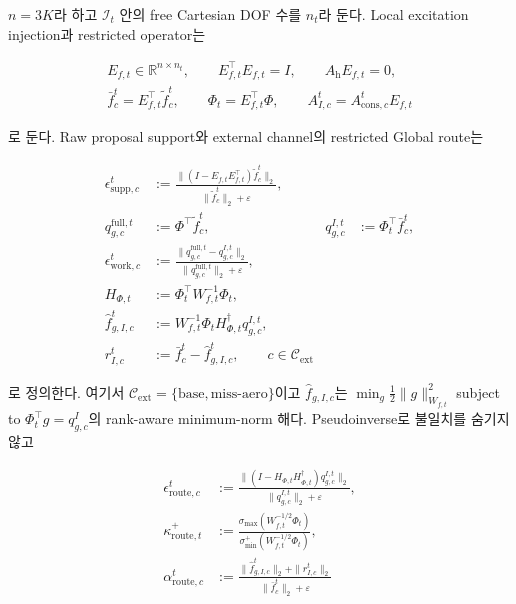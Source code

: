 \documentclass[11pt,a4paper]{article}
\newcommand{\R}{\mathbb{R}}
\newcommand{\eps}{\varepsilon}
\begin{document}
\(n=3K\)라 하고 \(\mathcal I_t\) 안의 free Cartesian DOF 수를 \(n_t\)라 둔다.
Local excitation injection과 restricted operator는

\begin{equation}
\begin{gathered}
  E_{f,t}\in\R^{n\times n_t},\qquad E_{f,t}^\top E_{f,t}=I,
  \qquad A_{\mathrm h}E_{f,t}=0,\\
  \bar f_c^t=E_{f,t}^\top\widetilde f_c^t,\qquad
  \Phi_t=E_{f,t}^\top\Phi,\qquad
  A_{I,c}^t=A_{\mathrm{cons},c}^tE_{f,t}
  \label{eq:support-restricted-operators}
\end{gathered}
\end{equation}

로 둔다. Raw proposal support와 external channel의 restricted Global route는

\begin{equation}
\begin{aligned}
  \epsilon_{\mathrm{supp},c}^t
  &:={}\frac{\|(I-E_{f,t}E_{f,t}^\top)\widetilde f_c^t\|_2}
              {\|\widetilde f_c^t\|_2+\eps},\\
  q_{g,c}^{\mathrm{full},t}
  &:={}\Phi^\top\widetilde f_c^t,
  &q_{g,c}^{I,t}&:=\Phi_t^\top\bar f_c^t,\\
  \epsilon_{\mathrm{work},c}^t
  &:={}\frac{\|q_{g,c}^{\mathrm{full},t}-q_{g,c}^{I,t}\|_2}
              {\|q_{g,c}^{\mathrm{full},t}\|_2+\eps},\\
  H_{\Phi,t}&:=\Phi_t^\top W_{f,t}^{-1}\Phi_t,\\
  \widehat f_{g,I,c}^t
  &:={}W_{f,t}^{-1}\Phi_tH_{\Phi,t}^{\dagger}q_{g,c}^{I,t},\\
  r_{I,c}^t&:=\bar f_c^t-\widehat f_{g,I,c}^t,
  \qquad c\in\mathcal C_{\mathrm{ext}}
  \label{eq:support-restricted-global-routing}
\end{aligned}
\end{equation}

로 정의한다. 여기서 \(\mathcal C_{\mathrm{ext}}=\{\mathrm{base},\mathrm{miss\mbox{-}aero}\}\)이고
\(\widehat f_{g,I,c}\)는
\(\min_g\tfrac12\|g\|_{W_{f,t}}^2\) subject to
\(\Phi_t^\top g=q_{g,c}^{I}\)의 rank-aware minimum-norm 해다.
Pseudoinverse로 불일치를 숨기지 않고

\begin{equation}
\begin{aligned}
  \epsilon_{\mathrm{route},c}^t
  &:={}\frac{\|(I-H_{\Phi,t}H_{\Phi,t}^{\dagger})q_{g,c}^{I,t}\|_2}
              {\|q_{g,c}^{I,t}\|_2+\eps},\\
  \kappa_{\mathrm{route},t}^{+}
  &:={}\frac{\sigma_{\max}(W_{f,t}^{-1/2}\Phi_t)}
              {\sigma_{\min}^{+}(W_{f,t}^{-1/2}\Phi_t)},\\
  \alpha_{\mathrm{route},c}^t
  &:={}\frac{\|\widehat f_{g,I,c}^t\|_2+\|r_{I,c}^t\|_2}
              {\|\bar f_c^t\|_2+\eps}
  \label{eq:support-routing-diagnostics}
\end{aligned}
\end{equation}
\end{document}
